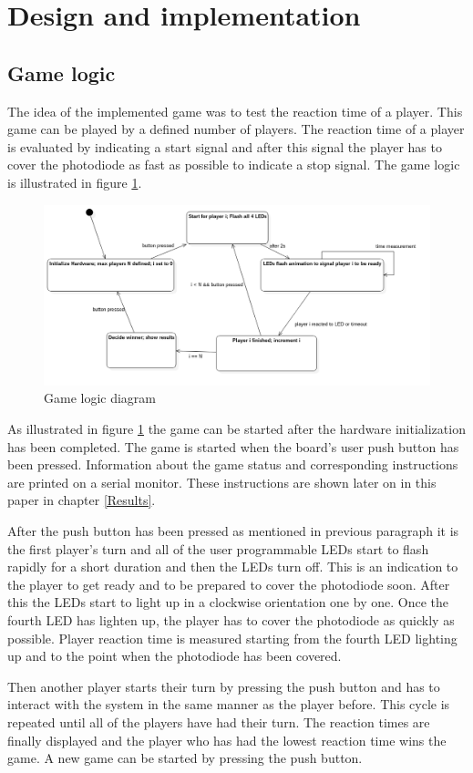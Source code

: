 \pagebreak


\section{Design and implementation}
\subsection{Game logic}
The idea of the implemented game was to test the reaction time of a player. This game can be played by a defined number of players. The reaction time of a player is evaluated by indicating a start signal and after this signal the player has to cover the photodiode as fast as possible to indicate a stop signal. The game logic is illustrated in figure \ref{fig:GameLogicDiagram}. 

\begin{figure}[htbp]
  \centering
     \includegraphics[width=1\textwidth]{./figures/FSM_Diagram.png}
  \caption{Game logic diagram}
  \label{fig:GameLogicDiagram}
\end{figure}

As illustrated in figure \ref{fig:GameLogicDiagram} the game can be started after the hardware initialization has been completed. The game is started when the board's user push button has been pressed. Information about the game status and corresponding instructions are printed on a serial monitor. These instructions are shown later on in this paper in chapter \ref{Results}.\\
\par
After the push button has been pressed as mentioned in previous paragraph it is the first player's turn and all of the user programmable LEDs start to flash rapidly for a short duration and then the LEDs turn off. This is an indication to the player to get ready and to be prepared to cover the photodiode soon. After this the LEDs start to light up in a clockwise orientation one by one. Once the fourth LED has lighten up, the player has to cover the photodiode as quickly as possible. Player reaction time is measured starting from the fourth LED lighting up and to the point when the photodiode has been covered.\\ 
\par
Then another player starts their turn by pressing the push button and has to interact with the system in the same manner as the player before. This cycle is repeated until all of the players have had their turn. The reaction times are finally displayed and the player who has had the lowest reaction time wins the game. A new game can be started by pressing the push button.

